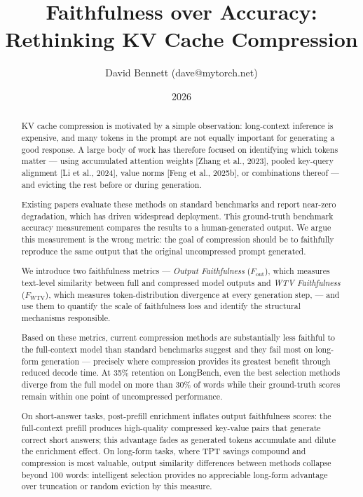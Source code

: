 \documentclass[10pt,letterpaper]{article}
\title{Faithfulness over Accuracy:\\Rethinking KV Cache Compression}
\author{David Bennett (dave@mytorch.net)}
\date{2026}
\begin{document}
\maketitle

\begin{abstract}
\normalsize
KV cache compression is motivated by a simple observation: long-context
inference is expensive, and many tokens in the prompt are not equally
important for generating a good response. A large body of work has
therefore focused on identifying which tokens matter --- using
accumulated attention weights {[}Zhang et al., 2023{]}, pooled key-query
alignment {[}Li et al., 2024{]}, value norms {[}Feng et al., 2025b{]},
or combinations thereof --- and evicting the rest before or during
generation.

Existing papers evaluate these methods on standard benchmarks and report
near-zero degradation, which has driven widespread deployment.
This ground-truth benchmark accuracy measurement compares the results to a human-generated output.
We argue this measurement is the wrong metric: the goal of
compression should be to faithfully reproduce the same output that the
original uncompressed prompt generated.

We introduce two faithfulness metrics --- 
\emph{Output Faithfulness} (\(F_{\text{out}}\)), which measures text-level similarity between
full and compressed model outputs 
and
\emph{WTV Faithfulness} (\(F_{\text{WTV}}\)), which
measures token-distribution divergence at every generation step, 
--- and use them to quantify the scale
of faithfulness loss and identify the structural mechanisms responsible.

Based on these metrics, current compression methods are substantially less faithful to the
full-context model than standard benchmarks suggest and they fail
most on long-form generation --- precisely where compression provides its
greatest benefit through reduced decode time. 
At 35\% retention on LongBench, even the best selection methods diverge from the full
model on more than 30\% of words while their ground-truth scores remain
within one point of uncompressed performance. 

On short-answer tasks, post-prefill enrichment inflates output faithfulness
scores: the full-context prefill produces high-quality compressed key-value
pairs that generate correct short answers; this advantage fades as generated
tokens accumulate and dilute the enrichment effect.  On long-form tasks, where
TPT savings compound and compression is most valuable, output similarity
differences between methods collapse beyond 100 words: intelligent
selection provides no appreciable long-form advantage over truncation or random
eviction by this measure. 


\end{abstract}
\end{document}
